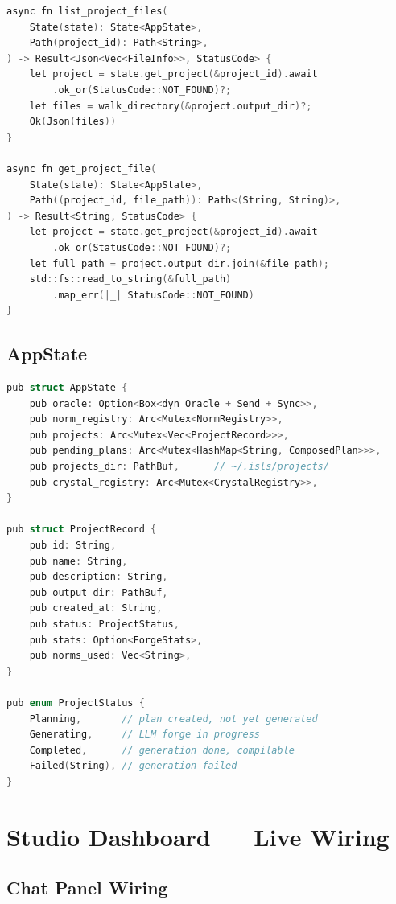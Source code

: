 \documentclass[11pt,a4paper]{article}
\begin{document}
\begin{lstlisting}[language=C]
async fn list_project_files(
    State(state): State<AppState>,
    Path(project_id): Path<String>,
) -> Result<Json<Vec<FileInfo>>, StatusCode> {
    let project = state.get_project(&project_id).await
        .ok_or(StatusCode::NOT_FOUND)?;
    let files = walk_directory(&project.output_dir)?;
    Ok(Json(files))
}

async fn get_project_file(
    State(state): State<AppState>,
    Path((project_id, file_path)): Path<(String, String)>,
) -> Result<String, StatusCode> {
    let project = state.get_project(&project_id).await
        .ok_or(StatusCode::NOT_FOUND)?;
    let full_path = project.output_dir.join(&file_path);
    std::fs::read_to_string(&full_path)
        .map_err(|_| StatusCode::NOT_FOUND)
}
\end{lstlisting}

\subsection{AppState}

\begin{lstlisting}[language=C]
pub struct AppState {
    pub oracle: Option<Box<dyn Oracle + Send + Sync>>,
    pub norm_registry: Arc<Mutex<NormRegistry>>,
    pub projects: Arc<Mutex<Vec<ProjectRecord>>>,
    pub pending_plans: Arc<Mutex<HashMap<String, ComposedPlan>>>,
    pub projects_dir: PathBuf,      // ~/.isls/projects/
    pub crystal_registry: Arc<Mutex<CrystalRegistry>>,
}

pub struct ProjectRecord {
    pub id: String,
    pub name: String,
    pub description: String,
    pub output_dir: PathBuf,
    pub created_at: String,
    pub status: ProjectStatus,
    pub stats: Option<ForgeStats>,
    pub norms_used: Vec<String>,
}

pub enum ProjectStatus {
    Planning,       // plan created, not yet generated
    Generating,     // LLM forge in progress
    Completed,      // generation done, compilable
    Failed(String), // generation failed
}
\end{lstlisting}

\section{Studio Dashboard --- Live Wiring}

\subsection{Chat Panel Wiring}
\end{document}
